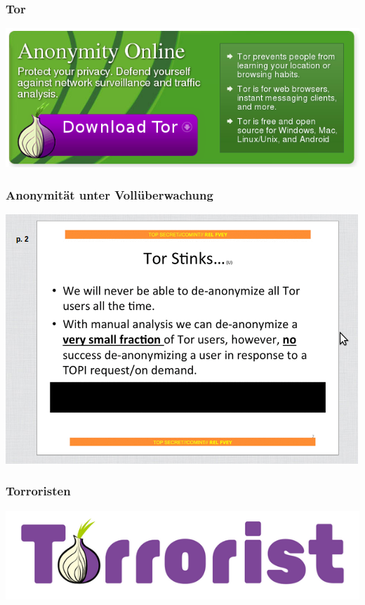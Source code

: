 \documentclass[12pt]{beamer}
\begin{document}
\begin{frame}
  \frametitle{Tor}
  \begin{center}
	\includegraphics[height=0.5\textheight]{img/tor-banner.png}
  \end{center}
\end{frame}

\begin{frame}
    \frametitle{Anonymität unter Vollüberwachung}
    \begin{center}
	\includegraphics[height=0.7\textheight]{img/torstinks.png}
    \end{center}
\end{frame}

\begin{frame}
    \frametitle{Torroristen}
    \begin{center}
	\includegraphics[width=0.8\textheight]{img/torrorist.png}
    \end{center}
\end{frame}
\end{document}
